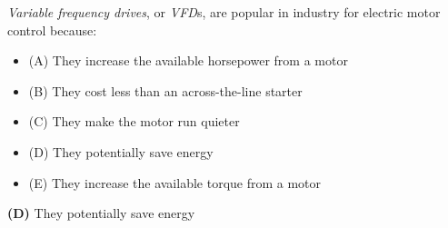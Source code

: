 

{\it Variable frequency drives}, or {\it VFD}s, are popular in industry for electric motor control because:

\begin{itemize}
\item{(A)} They increase the available horsepower from a motor
\vskip 5pt 
\item{(B)} They cost less than an across-the-line starter
\vskip 5pt 
\item{(C)} They make the motor run quieter
\vskip 5pt 
\item{(D)} They potentially save energy
\vskip 5pt 
\item{(E)} They increase the available torque from a motor
\end{itemize}







{\bf (D)} They potentially save energy











